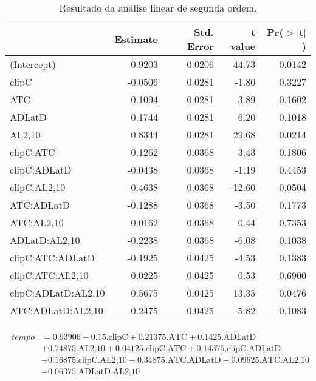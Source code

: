\begin{table}[h]
    \centering
    \caption{Resultado da análise linear de segunda ordem.}
    \begin{tabular}{l|rrrr}
      \hline
     & Estimate & Std. Error & t value & Pr($>$$|$t$|$) \\ 
      \hline
    (Intercept) & 0.9203 & 0.0206 & 44.73 & 0.0142 \\ 
      clipC & -0.0506 & 0.0281 & -1.80 & 0.3227 \\ 
      ATC & 0.1094 & 0.0281 & 3.89 & 0.1602 \\ 
      ADLatD & 0.1744 & 0.0281 & 6.20 & 0.1018 \\ 
      AL2,10 & 0.8344 & 0.0281 & 29.68 & 0.0214 \\ 
      clipC:ATC & 0.1262 & 0.0368 & 3.43 & 0.1806 \\ 
      clipC:ADLatD & -0.0438 & 0.0368 & -1.19 & 0.4453 \\ 
      clipC:AL2,10 & -0.4638 & 0.0368 & -12.60 & 0.0504 \\ 
      ATC:ADLatD & -0.1288 & 0.0368 & -3.50 & 0.1773 \\ 
      ATC:AL2,10 & 0.0162 & 0.0368 & 0.44 & 0.7353 \\ 
      ADLatD:AL2,10 & -0.2238 & 0.0368 & -6.08 & 0.1038 \\ 
      clipC:ATC:ADLatD & -0.1925 & 0.0425 & -4.53 & 0.1383 \\ 
      clipC:ATC:AL2,10 & 0.0225 & 0.0425 & 0.53 & 0.6900 \\ 
      clipC:ADLatD:AL2,10 & 0.5675 & 0.0425 & 13.35 & 0.0476 \\ 
      ATC:ADLatD:AL2,10 & -0.2475 & 0.0425 & -5.82 & 0.1083 \\ 
       \hline
    \end{tabular}
    \label{tab:model2}
\end{table}

\begin{align}
    \begin{split}
    tempo &= 0.93906 - 0.15\text{.clipC} + 0.21375\text{.ATC} + 0.1425\text{.ADLatD}  \\
    & + 0.74875\text{.AL2,10} + 0.04125\text{.clipC.ATC} + 0.14375\text{.clipC.ADLatD} \\
    & - 0.16875\text{.clipC.AL2,10} - 0.34875\text{.ATC.ADLatD} - 0.09625\text{.ATC.AL2,10} \\
    & - 0.06375\text{.ADLatD.AL2,10}
    \end{split}
\label{eq:model2}
\end{align}

